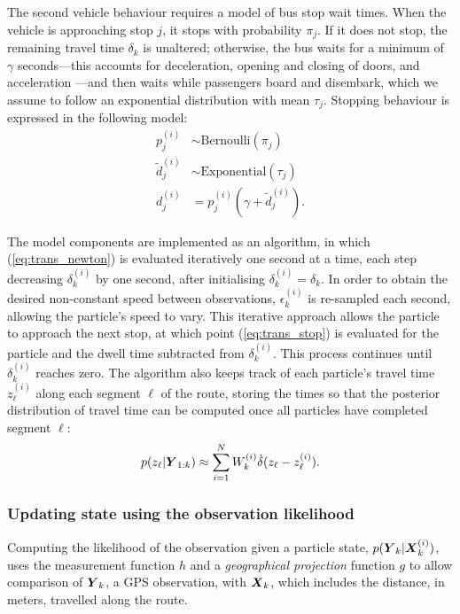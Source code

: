 The second vehicle behaviour requires a model of bus stop wait times.
When the vehicle is approaching stop $j$,
it stops with probability $\pi_j$.
If it does not stop, the remaining travel time $\delta_k$ is unaltered;
otherwise, the bus waits for a minimum of $\gamma$ seconds---this 
accounts for deceleration, opening and closing of doors, and acceleration
\citep{Hans_2015}---and then waits while passengers board and disembark,
which we assume to follow an exponential distribution with mean $\tau_j$.
Stopping behaviour is expressed in the following model:
\begin{equation}
\label{eq:trans_stop}
\begin{split}
p_j^{(i)} &\sim \mathrm{Bernoulli}(\pi_j) \\
\tilde d_j^{(i)} &\sim \mathrm{Exponential}(\tau_j) \\
d_j^{(i)} &= p_j^{(i)}(\gamma + \tilde d_j^{(i)}).
\end{split}
\end{equation}


The model components are implemented as an algorithm,
in which (\ref{eq:trans_newton}) is evaluated iteratively one second at a time,
each step decreasing $\delta_k^{(i)}$ by one second,
after initialising $\delta_k^{(i)} = \delta_k$.
In order to obtain the desired non-constant speed between observations,
$\epsilon_k^{(i)}$ is re-sampled each second,
allowing the particle's speed to vary.
This iterative approach allows the particle to approach the next stop,
at which point (\ref{eq:trans_stop}) is evaluated for the particle
and the dwell time subtracted from $\delta_k^{(i)}$.
This process continues until $\delta_k^{(i)}$ reaches zero.
The algorithm also keeps track of each particle's travel time $z_\ell^{(i)}$
along each segment $\ell$ of the route,
storing the times so that the posterior distribution of travel time
can be computed once all particles have completed segment $\ell$:
\begin{equation}
\label{eq:post_tt}
p(z_\ell | \mbox{$\boldsymbol{Y}$}_{1:k}) \approx
    \sum_{i=1}^N W_k^{(i)} \dot\delta(z_\ell - z_\ell^{(i)}).
\end{equation}



\subsubsection{Updating state using the observation likelihood}
\label{sec:pf_update}

Computing the likelihood of the observation given a particle state,
$p(\mbox{$\boldsymbol{Y}$}_k|\mbox{$\boldsymbol{X}$}_k^{(i)})$,
uses the measurement function $h$ and 
a \emph{geographical projection} function $g$ to allow comparison of $\mbox{$\boldsymbol{Y}$}_k$,
a GPS observation, with $\mbox{$\boldsymbol{X}$}_k$, 
which includes the distance, in meters, travelled along the route.

